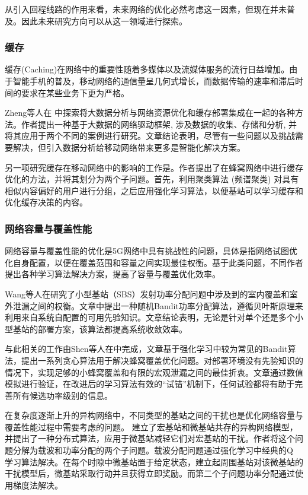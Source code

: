 \documentclass{IEEEtran}
\begin{document}
从引入回程线路的作用来看，未来网络的优化必然考虑这一因素，但现在并未普及。因此未来研究方向可以从这一领域进行探索。

\subsubsection{缓存}

缓存(Caching)在网络中的重要性随着多媒体以及流媒体服务的流行日益增加。由于智能手机的普及，移动网络的通信量呈几何式增长，而数据传输的速率和滞后时间的要求在某些业务下更为严格。

Zheng等人在\cite{Zheng2016} 中探索将大数据分析与网络资源优化和缓存部署集成在一起的各种方法。作者提出一种基于大数据的网络驱动框架, 涉及数据的收集、存储和分析, 并将其应用于两个不同的案例进行研究。文章结论表明，尽管有一些问题以及挑战需要解决，但引入数据分析给移动网络带来更多是智能化解决方案。


另一项研究缓存在移动网络中的影响的工作是\cite{ElBamby2014}。作者提出了在蜂窝网络中进行缓存优化的方法，并将其划分为两个子问题。首先，利用聚类算法 (频谱聚类) 对具有相似内容偏好的用户进行分组，之后应用强化学习算法，以便基站可以学习缓存和优化缓存决策的内容。


\subsubsection{网络容量与覆盖性能}
网络容量与覆盖性能的优化是5G网络中具有挑战性的问题，具体是指网络试图优化自身配置，以便在覆盖范围和容量之间实现最佳权衡。基于此类问题，不同作者提出各种学习算法解决方案，提高了容量与覆盖优化效率。

Wang等人在\cite{Wang2017}研究了小型基站（SBS）发射功率分配问题中涉及到的室内覆盖和室外泄漏之间的权衡。文章中提出一种随机Bandit功率分配算法，遵循贝叶斯原理来利用来自系统自配置的可用先验知识。文章结论表明，无论是针对单个还是多个小型基站的部署方案，该算法都提高系统收敛效率。

与此相关的工作由Shen等人在\cite{Shen2018}中完成，文章基于强化学习中较为常见的Bandit算法，提出一系列贪心算法用于解决蜂窝覆盖优化问题。对部署环境没有先验知识的情况下，实现足够的小蜂窝覆盖和有限的宏观泄漏之间的最佳折衷。文章通过数值模拟进行验证，在改进后的学习算法有效的“试错”机制下，任何试验都将有助于完善所有候选功率级别的信息。

在复杂度逐渐上升的异构网络中，不同类型的基站之间的干扰也是优化网络容量与覆盖性能过程中需要考虑的问题。
\cite{Bennis2010}建立了宏基站和微基站共存的异构网络模型，并提出了一种分布式算法，应用于微基站减轻它们对宏基站的干扰。作者将这个问题分解为载波和功率分配的两个子问题。载波分配问题通过强化学习中经典的Q 学习算法解决。在每个时隙中微基站置于给定状态，建立起周围基站对该微基站的干扰模型后，微基站采取行动并且获得立即奖励。而第二个子问题功率分配通过使用梯度法解决。
\end{document}

